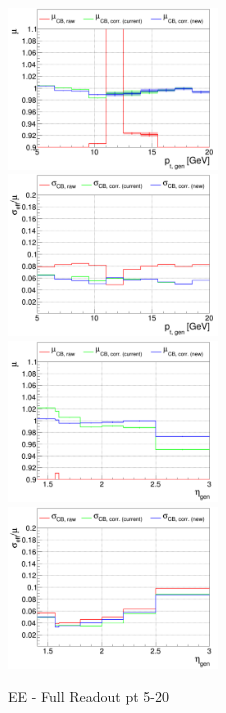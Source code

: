 \begin{figure}
\includegraphics[width=0.495\textwidth]{./ECAL_plots/plotsNoPU/EE/pdf/FULL/GENPT/EEFULL_GENPT_0005_0020_MuOverBins.pdf}
\includegraphics[width=0.495\textwidth]{./ECAL_plots/plotsNoPU/EE/pdf/FULL/GENPT/EEFULL_GENPT_0005_0020_EffSigmaOverBins.pdf}
\includegraphics[width=0.495\textwidth]{./ECAL_plots/plotsNoPU/EE/pdf/FULL/GENETA/EEFULL_GENETA_0005_0020_MuOverBins.pdf}
\includegraphics[width=0.495\textwidth]{./ECAL_plots/plotsNoPU/EE/pdf/FULL/GENETA/EEFULL_GENETA_0005_0020_EffSigmaOverBins.pdf}
\caption{EE - Full Readout pt 5-20}
\end{figure}


